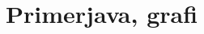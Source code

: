 \documentclass[12pt,a4paper]{amsart}
\theoremstyle{definition} %
\theoremstyle{plain} %
\newtheorem{lema}[definicija]{Lema}
\newtheorem{izrek}[definicija]{Izrek}
\newcommand{\geslo}[2]{\noindent\textbf{#1}\hspace*{3mm}\hangindent=\parindent\hangafter=1 #2}
\begin{document}
\section{Primerjava, grafi}









%
%
%
%
%
%
%
%
%
%
\end{document}
